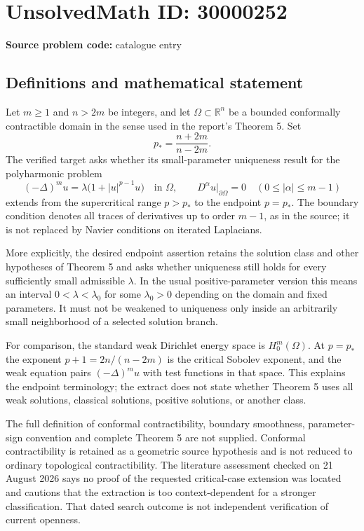 \documentclass[11pt]{article}
\newcommand{\R}{\mathbb{R}}
\begin{document}
\section*{UnsolvedMath ID: 30000252}
\textbf{Source problem code:} catalogue entry
\subsection{Definitions and mathematical statement}
Let $m\ge1$ and $n>2m$ be integers, and let $\Omega\subset\R^n$ be a bounded conformally contractible domain in the sense used in the report's Theorem 5. Set
\[
 p_* =\frac{n+2m}{n-2m}.
\]
The verified target asks whether its small-parameter uniqueness result for the polyharmonic problem
\[
 (-\Delta)^m u=\lambda\bigl(1+|u|^{p-1}u\bigr)\quad\text{in }\Omega,
 \qquad D^\alpha u|_{\partial\Omega}=0\quad(0\le|\alpha|\le m-1)
\]
extends from the supercritical range $p>p_*$ to the endpoint $p=p_*$. The boundary condition denotes all traces of derivatives up to order $m-1$, as in the source; it is not replaced by Navier conditions on iterated Laplacians.

More explicitly, the desired endpoint assertion retains the solution class and other hypotheses of Theorem 5 and asks whether uniqueness still holds for every sufficiently small admissible $\lambda$. In the usual positive-parameter version this means an interval $0<\lambda<\lambda_0$ for some $\lambda_0>0$ depending on the domain and fixed parameters. It must not be weakened to uniqueness only inside an arbitrarily small neighborhood of a selected solution branch.

For comparison, the standard weak Dirichlet energy space is $H_0^m(\Omega)$. At $p=p_*$ the exponent $p+1=2n/(n-2m)$ is the critical Sobolev exponent, and the weak equation pairs $(-\Delta)^m u$ with test functions in that space. This explains the endpoint terminology; the extract does not state whether Theorem 5 uses all weak solutions, classical solutions, positive solutions, or another class.

The full definition of conformal contractibility, boundary smoothness, parameter-sign convention and complete Theorem 5 are not supplied. Conformal contractibility is retained as a geometric source hypothesis and is not reduced to ordinary topological contractibility. The literature assessment checked on 21 August 2026 says no proof of the requested critical-case extension was located and cautions that the extraction is too context-dependent for a stronger classification. That dated search outcome is not independent verification of current openness.
\end{document}
